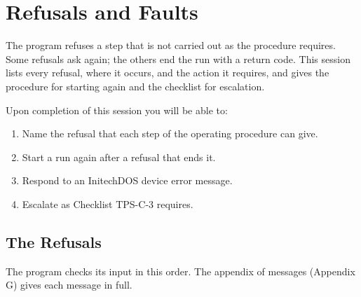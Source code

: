 \chapter{Refusals and Faults}

The program refuses a step that is not carried out as
the procedure requires.  Some refusals ask again; the others end the run
with a return code.  This session lists every refusal, where it occurs, and
the action it requires, and gives the procedure for starting again and the
checklist for escalation.

Upon completion of this session you will be able to:
\begin{enumerate}
\item Name the refusal that each step of the operating procedure can give.
\item Start a run again after a refusal that ends it.
\item Respond to an InitechDOS device error message.
\item Escalate as Checklist TPS-C-3 requires.
\end{enumerate}

\section{The Refusals}
The program checks its input in this order.  The appendix of messages
(Appendix G) gives each message in full.

